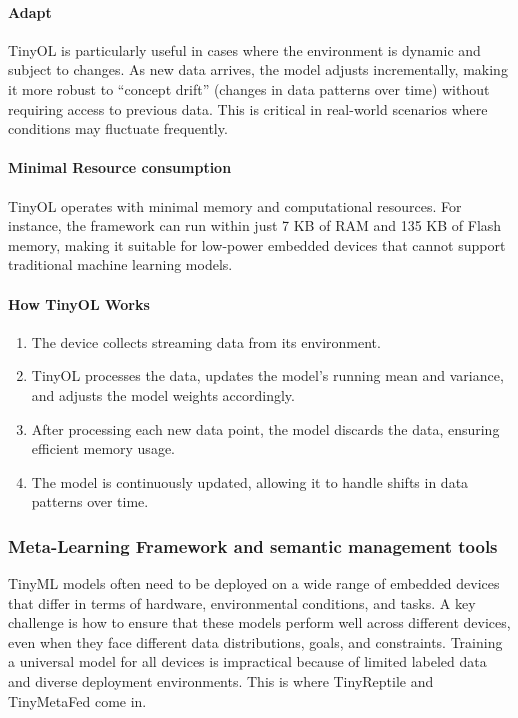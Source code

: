 \documentclass[twocolumn]{article}
\begin{document}
\paragraph{Adapt} TinyOL is particularly useful in cases where the environment is dynamic and subject to changes. As new data arrives, the model adjusts incrementally, making it more robust to “concept drift” (changes in data patterns over time) without requiring access to previous data. This is critical in real-world scenarios where conditions may fluctuate frequently. 
\paragraph{Minimal Resource consumption}TinyOL operates with minimal memory and computational resources. For instance, the framework can run within just 7 KB of RAM and 135 KB of Flash memory, making it suitable for low-power embedded devices that cannot support traditional machine learning models.

\paragraph{How TinyOL Works}

\begin{enumerate}
    \item The device collects streaming data from its environment.
    \item TinyOL processes the data, updates the model’s running mean and variance, and adjusts the model weights accordingly.
    \item After processing each new data point, the model discards the data, ensuring efficient memory usage.
    \item The model is continuously updated, allowing it to handle shifts in data patterns over time.
\end{enumerate}
\subsubsection{Meta-Learning Framework and semantic management tools  }

TinyML models often need to be deployed on a wide range of embedded devices that differ in terms of hardware, environmental conditions, and tasks. A key challenge is how to ensure that these models perform well across different devices, even when they face different data distributions, goals, and constraints. Training a universal model for all devices is impractical because of limited labeled data and diverse deployment environments. This is where TinyReptile and TinyMetaFed come in.
\end{document}
